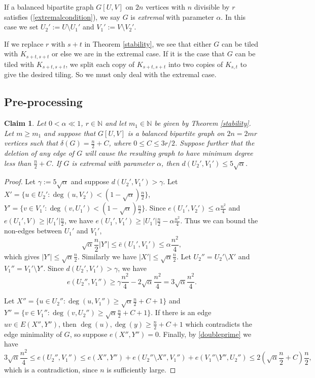 \documentclass[oneside,12pt]{memoir}
\newtheorem{claim}[theorem]{Claim}
\begin{document}
If a balanced bipartite graph $G[U,V]$ on $2n$ vertices with $n$ divisible by $r$ satisfies (\ref{extremalcondition}), we say $G$ is \emph{extremal} with parameter $\alpha$.  In this case we set $U_2':=U\setminus U_1'$ and $V_1':=V\setminus V_2'$.

If we replace $r$ with $s+t$ in Theorem \ref{stability}, we see that either $G$ can be tiled with $K_{s+t,s+t}$ or else we are in the extremal case.  If it is the case that $G$ can be tiled with $K_{s+t,s+t}$, we split each copy of $K_{s+t,s+t}$ into two copies of $K_{s,t}$ to give the desired tiling.  So we must only deal with the extremal case.

\subsection{Pre-processing}\label{preprocess1}

\begin{claim}\label{diagonals}
Let $0<\alpha\ll 1$, $r\in \mathbb{N}$ and let $m_1\in \mathbb{N}$ be given by Theorem \ref{stability}.  Let $m\geq m_1$ and suppose that $G[U,V]$ is a balanced bipartite graph on $2n=2mr$ vertices such that $\delta(G)= \frac{n}{2}+C$, where $0\leq C\leq 3r/2$.  Suppose further that the deletion of any edge of $G$ will cause the resulting graph to have minimum degree less than $\frac{n}{2} +C$.  If $G$ is extremal with parameter $\alpha$, then $d(U_2', V_1')\leq 5\sqrt{\alpha}$.
\end{claim}

\begin{proof}
Let $\gamma:=5\sqrt{\alpha}$ and suppose $d(U_2',V_1')>\gamma$.  Let $X'=\{u\in U_2':\deg(u,V_2')<(1-\sqrt{\alpha})\frac{n}{2}\}$, $Y'=\{v\in V_1':\deg(v,U_1')<(1-\sqrt{\alpha})\frac{n}{2}\}$. Since $e(U_1',V_2')\leq \alpha \frac{n^2}{4}$ and $e(U_1',V)\geq |U_1'|\frac{n}{2}$, we have $e(U_1', V_1')\geq |U_1'|\frac{n}{2}-\alpha\frac{n^2}{4}$.  Thus we can bound the non-edges between $U_1'$ and $V_1'$, $$\sqrt{\alpha}\frac{n}{2}|Y'|\leq \bar{e}(U_1',V_1')\leq \alpha\frac{n^2}{4},$$ which gives $|Y'|\leq\sqrt{\alpha}\frac{n}{2}$.  Similarly we have $|X'|\leq \sqrt{\alpha}\frac{n}{2}$. Let $U_2''=U_2'\setminus X'$ and $V_1''=V_1'\setminus Y'$.  Since $d(U_2', V_1')>\gamma$, we have
\begin{equation}\label{doubleprime}
e(U_2'',V_1'')\geq \gamma\frac{n^2}{4}-2\sqrt{\alpha}\frac{n^2}{4}=3\sqrt{\alpha}\frac{n^2}{4}.
\end{equation}

Let $X''=\{u\in U_2'':\deg(u,V_1'')\geq \sqrt{\alpha}\frac{n}{2}+C+1\}$ and $Y''=\{v\in V_1'':\deg(v,U_2'')\geq \sqrt{\alpha}\frac{n}{2}+C+1\}$.  If there is an edge $uv\in E(X'', Y'')$, then $\deg(u),\deg(y)\geq\frac{n}{2}+C+1$ which contradicts the edge minimality of $G$, so suppose $e(X'', Y'')=0$. Finally, by \eqref{doubleprime} we have 
$$3\sqrt{\alpha}\frac{n^2}{4}\leq e(U_2'',V_1'')\leq e(X'',Y'')+e(U_2''\setminus X'',V_1'')+e(V_1''\setminus Y'', U_2'')\leq 2(\sqrt{\alpha}\frac{n}{2}+C)\frac{n}{2},$$
which is a contradiction, since $n$ is sufficiently large.

\end{proof}
\end{document}
